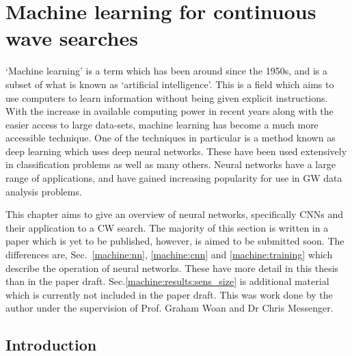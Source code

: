 \chapter[Machine learning for CWs]{\label{machine} Machine learning for continuous wave searches}


`Machine learning' is a term which has been around since the 1950s, and is a subset of what is known as `artificial intelligence'.
This is a field which aims to use computers to learn information without being given explicit instructions.
With the increase in available computing power in recent years along with the easier access to large data-sets, machine learning has become a much more accessible technique.
One of the techniques in particular is a method known as deep learning which uses deep neural networks.
These have been used extensively in classification problems as well as many others.
Neural networks have a large range of applications, and have gained increasing popularity for use in \gls{GW} data analysis problems.

This chapter aims to give an overview of neural networks, specifically \glspl{CNN} and their application to a \gls{CW} search. 
The majority of this section is written in a paper which is yet to be published, however, is aimed to be submitted soon.
The differences are, Sec.~\ref{machine:nn}, \ref{machine:cnn} and \ref{machine:training} which describe the operation of neural networks. These have more detail in this thesis than in the paper draft. 
Sec.\ref{machine:results:sens_size} is additional material which is currently not included in the paper draft.
This was work done by the author under the supervision of Prof. Graham Woan and Dr Chris Messenger.

\section{\label{machine:intro} Introduction}

